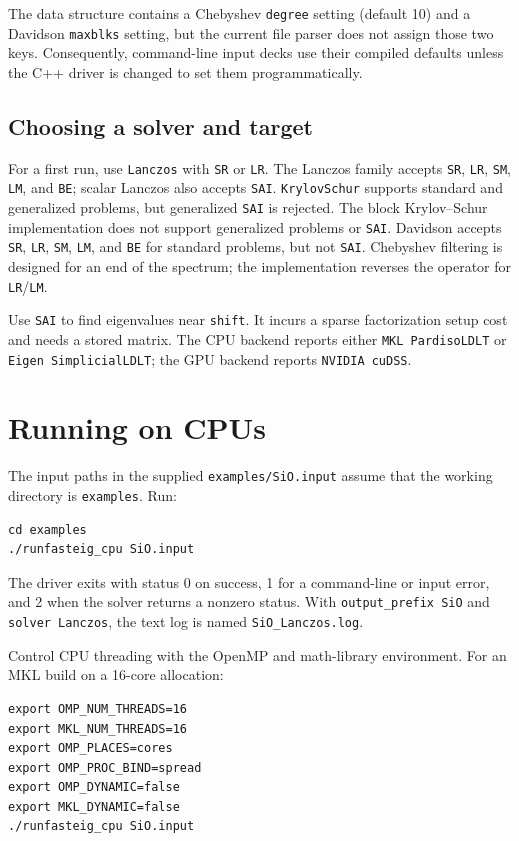 \documentclass[11pt]{article}
\newcommand{\code}[1]{\texttt{#1}}
\begin{document}
The data structure contains a Chebyshev \code{degree} setting (default 10) and
a Davidson \code{maxblks} setting, but the current file parser does not assign
those two keys.  Consequently, command-line input decks use their compiled
defaults unless the C++ driver is changed to set them programmatically.

\subsection{Choosing a solver and target}

For a first run, use \code{Lanczos} with \code{SR} or \code{LR}.  The Lanczos
family accepts \code{SR}, \code{LR}, \code{SM}, \code{LM}, and \code{BE}; scalar
Lanczos also accepts \code{SAI}.  \code{KrylovSchur} supports standard and
generalized problems, but generalized \code{SAI} is rejected.  The block
Krylov--Schur implementation does not support generalized problems or
\code{SAI}.  Davidson accepts \code{SR}, \code{LR}, \code{SM}, \code{LM}, and
\code{BE} for standard problems, but not \code{SAI}.  Chebyshev filtering is
designed for an end of the spectrum; the implementation reverses the operator
for \code{LR}/\code{LM}.

Use \code{SAI} to find eigenvalues near \code{shift}.  It incurs a sparse
factorization setup cost and needs a stored matrix.  The CPU backend reports
either \code{MKL PardisoLDLT} or \code{Eigen SimplicialLDLT}; the GPU backend
reports \code{NVIDIA cuDSS}.

\section{Running on CPUs}

The input paths in the supplied \code{examples/SiO.input} assume that the
working directory is \code{examples}.  Run:

\begin{lstlisting}
cd examples
./runfasteig_cpu SiO.input
\end{lstlisting}

The driver exits with status 0 on success, 1 for a command-line or input error,
and 2 when the solver returns a nonzero status.  With
\code{output\_prefix SiO} and \code{solver Lanczos}, the text log is named
\code{SiO\_Lanczos.log}.

Control CPU threading with the OpenMP and math-library environment.  For an
MKL build on a 16-core allocation:

\begin{lstlisting}
export OMP_NUM_THREADS=16
export MKL_NUM_THREADS=16
export OMP_PLACES=cores
export OMP_PROC_BIND=spread
export OMP_DYNAMIC=false
export MKL_DYNAMIC=false
./runfasteig_cpu SiO.input
\end{lstlisting}
\end{document}
